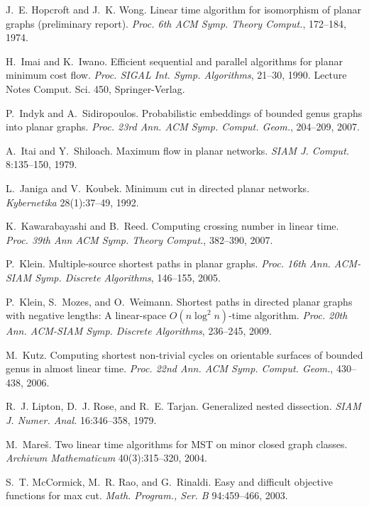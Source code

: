 \begin{thebibliography}{10}
J.~E. Hopcroft and J.~K. Wong.
\newblock Linear time algorithm for isomorphism of planar graphs (preliminary
  report).
\newblock \emph{Proc. 6th ACM Symp. Theory Comput.}, 172--184, 1974.

H.~Imai and K.~Iwano.
\newblock Efficient sequential and parallel algorithms for planar minimum cost
  flow.
\newblock \emph{Proc. SIGAL Int. Symp. Algorithms}, 21--30, 1990. Lecture Notes
  Comput. Sci. 450, Springer-Verlag.

P.~Indyk and A.~Sidiropoulos.
\newblock Probabilistic embeddings of bounded genus graphs into planar graphs.
\newblock \emph{Proc. 23rd Ann. ACM Symp. Comput. Geom.}, 204--209, 2007.

A.~Itai and Y.~Shiloach.
\newblock Maximum flow in planar networks.
\newblock \emph{SIAM J. Comput.} 8:135--150, 1979.

L.~Janiga and V.~Koubek.
\newblock Minimum cut in directed planar networks.
\newblock \emph{Kybernetika} 28(1):37--49, 1992.

K.~Kawarabayashi and B.~Reed.
\newblock Computing crossing number in linear time.
\newblock \emph{Proc. 39th Ann ACM Symp. Theory Comput.}, 382--390, 2007.

P.~Klein.
\newblock Multiple-source shortest paths in planar graphs.
\newblock \emph{Proc. 16th Ann. ACM-SIAM Symp. Discrete Algorithms}, 146--155,
  2005.

P.~Klein, S.~Mozes, and O.~Weimann.
\newblock Shortest paths in directed planar graphs with negative lengths: {A}
  linear-space {$O(n\log^2 n)$}-time algorithm.
\newblock \emph{Proc. 20th Ann. ACM-SIAM Symp. Discrete Algorithms}, 236--245,
  2009.

M.~Kutz.
\newblock Computing shortest non-trivial cycles on orientable surfaces of
  bounded genus in almost linear time.
\newblock \emph{Proc. 22nd Ann. ACM Symp. Comput. Geom.}, 430--438, 2006.

R.~J. Lipton, D.~J. Rose, and R.~E. Tarjan.
\newblock Generalized nested dissection.
\newblock \emph{SIAM J. Numer. Anal.} 16:346--358, 1979.

M.~Mare{\v s}.
\newblock Two linear time algorithms for {MST} on minor closed graph classes.
\newblock \emph{Archivum Mathematicum} 40(3):315--320, 2004.

S.~T. McCormick, M.~R. Rao, and G.~Rinaldi.
\newblock Easy and difficult objective functions for max cut.
\newblock \emph{Math. Program., Ser. B} 94:459--466, 2003.


\end{thebibliography}
